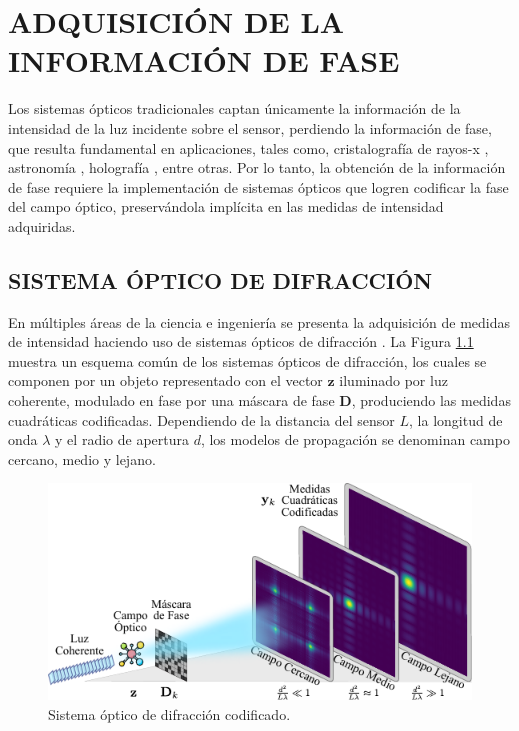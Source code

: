 \chapter{ADQUISICIÓN DE LA INFORMACIÓN DE FASE}

Los sistemas ópticos tradicionales captan únicamente la información de la intensidad de la luz incidente sobre el sensor, perdiendo la información de fase, que resulta fundamental en aplicaciones, tales como, cristalografía de rayos-x , astronomía , holografía , entre otras. Por lo tanto, la obtención de la información de fase  requiere la implementación  de sistemas ópticos que logren codificar la fase del campo óptico, preservándola implícita en las medidas de intensidad adquiridas. 
    
\section{SISTEMA ÓPTICO DE DIFRACCIÓN}
En múltiples áreas de la ciencia e ingeniería se presenta la adquisición de medidas de intensidad haciendo uso de sistemas ópticos de difracción . La Figura \ref{fig:difraction_systems} muestra un esquema común de los sistemas ópticos de difracción, los cuales se componen por un objeto representado con el vector $\mathbf{z}$ iluminado por luz coherente, modulado en fase por una máscara de fase $\mathbf{D}$, produciendo las medidas cuadráticas codificadas. Dependiendo de la distancia del sensor $L$, la longitud de onda $\lambda$ y el radio de apertura $d$, los modelos de propagación se denominan campo cercano, medio y lejano.

\begin{figure}[h]
    \centering
    \includegraphics[width=\linewidth]{images/DiffractionSystem.pdf}
    \caption{\hspace{2mm}Sistema óptico de difracción codificado.}
    \label{fig:difraction_systems}
\end{figure}

